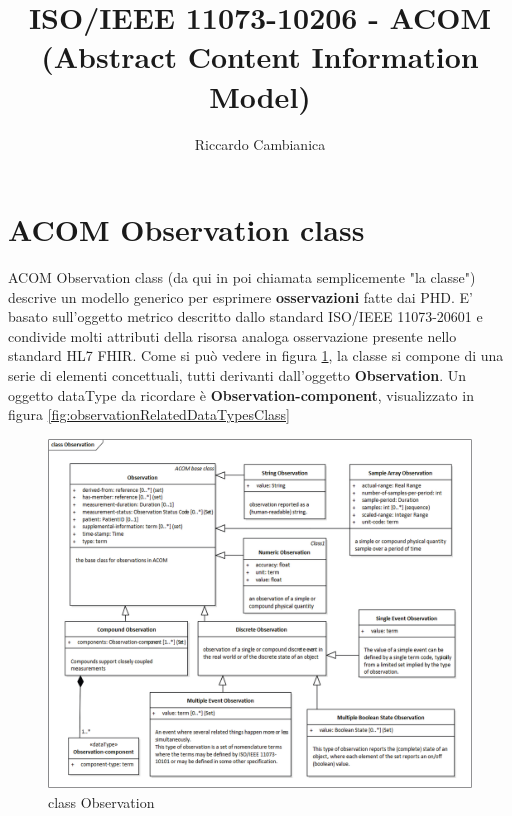 \documentclass[a4paper]{article}
\title{ISO/IEEE 11073-10206 - ACOM (Abstract Content Information Model)}
\author{Riccardo Cambianica}
\begin{document}
    \maketitle
    \section*{ACOM Observation class}
        ACOM Observation class (da qui in poi chiamata semplicemente "la classe") descrive un modello generico per esprimere \textbf{osservazioni} fatte dai PHD. 
        E' basato sull'oggetto metrico descritto dallo standard ISO/IEEE 11073-20601 e condivide molti attributi della risorsa analoga osservazione presente nello standard HL7 FHIR.
        Come si può vedere in figura \ref{fig:observationClass}, la classe si compone di una serie di elementi concettuali, tutti derivanti dall'oggetto \textbf{Observation}.
        Un oggetto dataType da ricordare è \textbf{Observation-component}, visualizzato in figura \ref*{fig:observationRelatedDataTypesClass}  
        \begin{figure}[ht]
            \centering
            \includegraphics[width=1\textwidth]{figures/observation class.png}
            \caption{class Observation}
            \label{fig:observationClass}
        \end{figure}
\end{document}
